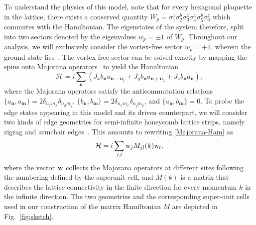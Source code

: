 \documentclass[aps,prb,twocolumn,superscriptaddress,groupedaddress]{revtex4}
\begin{document}
To understand the physics of this model,  note that for every hexagonal plaquette in the lattice, there exists a conserved quantity $W_p = \sigma_1^x  \sigma_2^y  \sigma_3^z  \sigma_4^x  \sigma_5^y  \sigma_6^z$ which commutes with the Hamiltonian.   
The eigenstates of the system therefore, split into two sectors denoted by the eigenvalues $w_p= \pm 1$ of $W_p$. 
Throughout our analysis, we will exclusively consider the vortex-free sector $w_p=+1$, wherein the ground state  lies~\cite{KitaevAnnals:2006}.
The vortex-free sector can be solved exactly by mapping the spins onto Majorana operators~\cite{Baskaran:2007,Lee:2007,Chen:2008,Nussinov:2008,Thakurathi:2014} to yield the Hamiltonian
%
\begin{equation}
\mathcal{H} = i \sum_{\mathbf{n}} \left( J_x b_{\mathbf{n}} a_{\mathbf{n} - \mathbf{n}_1} +  J_y b_{\mathbf{n}} a_{\mathbf{n}  + \mathbf{n}_2} + J_z b_{\mathbf{n}} a_{\mathbf{n}} \right),
\label{Majorana-Ham}
\end{equation}
%
where the Majorana operators satisfy the anticommutation relations $\{ a_{\mathbf{n}}, a_{\mathbf{m}} \} = 2 \delta_{n_x m_x} \delta_{n_y m_y}$,  $\{ b_{\mathbf{n}}, b_{\mathbf{m}} \} = 2 \delta_{n_x m_x} \delta_{n_y m_y}$, and $\{ a_{\mathbf{n}}, b_{\mathbf{m}} \} =0$.
To probe the edge states appearing in this model and its driven counterpart, we will consider two kinds of edge geometries for semi-infinite honeycomb lattice strips, namely zigzag and armchair edges~\cite{Nakada:1996, Kohmoto:2007}. This amounts to rewriting \eqref{Majorana-Ham} as~\cite{Thakurathi:2014}
%
\begin{equation}
\mathcal{H} = i \sum_{j,l} {\rm w}_j M_{jl}(k) {\rm w}_l, 
\label{matrix-Ham}
\end{equation}
%
where the vector $\bf{w}$ collects the Majorana operators at different sites following the numbering defined by the superunit cell, and $M(k)$ is a matrix that describes the lattice connectivity in the finite direction for every momentum $k$ in the infinite direction. The two  geometries and the corresponding super-unit cells used in our construction of the matrix Hamiltonian $M$ are depicted in Fig.~\ref{fig:sketch}.
\end{document}
